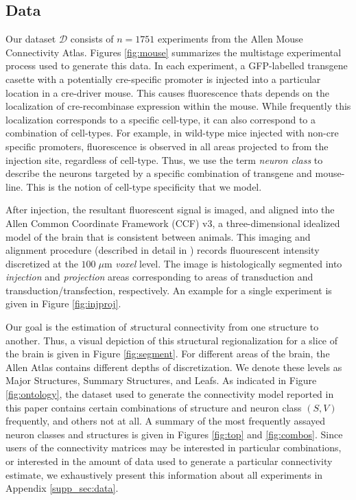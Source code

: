 \subsection{Data}

Our dataset $\mathcal D$ consists of $n=1751$ experiments from the Allen Mouse Connectivity Atlas.
Figures \ref{fig:mouse} summarizes the multistage experimental process used to generate this data.
In each experiment, a GFP-labelled transgene casette with a potentially cre-specific promoter is injected into a particular location in a cre-driver mouse.
This causes fluorescence thats depends on the localization of cre-recombinase expression within the mouse.
While frequently this localization corresponds to a specific cell-type, it can also correspond to a combination of cell-types.
For example, in wild-type mice injected with non-cre specific promoters, fluorescence is observed in all areas projected to from the injection site, regardless of cell-type.
Thus, we use the term \textit{neuron class} to describe the neurons targeted by a specific combination of transgene and mouse-line.
This is the notion of cell-type specificity that we model.

After injection, the resultant fluorescent signal is imaged, and aligned into the Allen Common Coordinate Framework (CCF) v3, a three-dimensional idealized model of the brain that is consistent between animals.
This imaging and alignment procedure (described in detail in \citep{Harris2019-mr}) records fluourescent intensity discretized at the $100 \; \mu$m \textit{voxel} level. 
The image is histologically segmented into \textit{injection} and \textit{projection} areas corresponding to areas of transduction and transduction/transfection, respectively.
An example for a single experiment is given in Figure \ref{fig:injproj}.

Our goal is the estimation of {\textit structural connectivity} from one structure to another.
Thus, a visual depiction of this structural regionalization for a slice of the brain is given in Figure \ref{fig:segment}.
For different areas of the brain, the Allen Atlas contains different depths of discretization.
We denote these levels as Major Structures, Summary Structures, and Leafs.
As indicated in Figure \ref{fig:ontology}, the dataset used to generate the connectivity model reported in this paper contains certain combinations of structure and neuron class $(S,V)$ frequently, and others not at all.
A summary of the most frequently assayed neuron classes and structures is given in Figures \ref{fig:top} and \ref{fig:combos}.
Since users of the connectivity matrices may be interested in particular combinations, or interested in the amount of data used to generate a particular connectivity estimate, we exhaustively present this information about all experiments in Appendix \ref*{supp_sec:data}.

